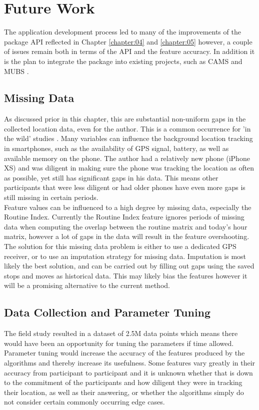 \clearpage
\section{Future Work}
The application development process led to many of the improvements of the package API reflected in Chapter \ref{chapter:04} and \ref{chapter:05} however, a couple of issues remain both in terms of the API and the feature accuracy. In addition it is the plan to integrate the package into existing projects, such as CAMS \cite{CAMS} and MUBS \cite{mubs-rohani}.

\subsection{Missing Data}
As discussed prior in this chapter, this are substantial non-uniform gaps in the collected location data, even for the author. This is a common occurrence for 'in the wild' studies \cite{detecting_bipolar_from_gps}. Many variables can influence the background location tracking in smartphones, such as the availability of GPS signal, battery, as well as available memory on the phone. The author had a relatively new phone (iPhone XS) and was diligent in making sure the phone was tracking the location as often as possible, yet still has significant gaps in his data. This means other participants that were less diligent or had older phones have even more gaps is still missing in certain periods. \\

Feature values can be influenced to a high degree by missing data, especially the Routine Index. Currently the Routine Index feature ignores periods of missing data when computing the overlap between the routine matrix and today's hour matrix, however a lot of gaps in the data will result in the feature overshooting. The solution for this missing data problem is either to use a dedicated GPS receiver, or to use an imputation strategy for missing data. Imputation is most likely the best solution, and can be carried out by filling out gaps using the saved stops and moves as historical data. This may likely bias the features however it will be a promising alternative to the current method.

\subsection{Data Collection and Parameter Tuning}
The field study resulted in a dataset of 2.5M data points which means there would have been an opportunity for tuning the parameters if time allowed. Parameter tuning would increase the accuracy of the features produced by the algorithms and thereby increase its usefulness. Some features vary greatly in their accuracy from participant to participant and it is unknown whether that is down to the commitment of the participants and how diligent they were in tracking their location, as well as their answering, or whether the algorithms simply do not consider certain commonly occurring edge cases.\\

